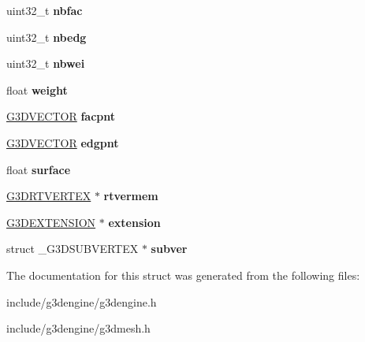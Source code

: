 \begin{DoxyCompactItemize}
\item 
\mbox{\label{struct__G3DVERTEX_a05bfa59c4f4d183ff1b148605353e336}} 
uint32\+\_\+t {\bfseries nbfac}
\item 
\mbox{\label{struct__G3DVERTEX_ad70b96f8b45c11d8a4779f0d58c625f6}} 
uint32\+\_\+t {\bfseries nbedg}
\item 
\mbox{\label{struct__G3DVERTEX_a1cbb7096622af76fb5b84c6425c23a5f}} 
uint32\+\_\+t {\bfseries nbwei}
\item 
\mbox{\label{struct__G3DVERTEX_a3c599f5c20b4c4006817278817d275e9}} 
float {\bfseries weight}
\item 
\mbox{\label{struct__G3DVERTEX_a9dcb3a95b512697296863ba392d60b39}} 
\hyperlink{structG3DVECTOR}{G3\+D\+V\+E\+C\+T\+OR} {\bfseries facpnt}
\item 
\mbox{\label{struct__G3DVERTEX_ab2670b69cc9220392b9759a4f5c8651e}} 
\hyperlink{structG3DVECTOR}{G3\+D\+V\+E\+C\+T\+OR} {\bfseries edgpnt}
\item 
\mbox{\label{struct__G3DVERTEX_a8d66921a7358047aa269addd56767a1b}} 
float {\bfseries surface}
\item 
\mbox{\label{struct__G3DVERTEX_a655e3d14e8b5e9dbfd8a9382b155a147}} 
\hyperlink{struct__G3DRTVERTEX}{G3\+D\+R\+T\+V\+E\+R\+T\+EX} $\ast$ {\bfseries rtvermem}
\item 
\mbox{\label{struct__G3DVERTEX_ad787300f8dd26420972d674b4f744eb7}} 
\hyperlink{struct__G3DEXTENSION}{G3\+D\+E\+X\+T\+E\+N\+S\+I\+ON} $\ast$ {\bfseries extension}
\item 
\mbox{\label{struct__G3DVERTEX_a2d38b8479ebceb505d983c452093c6cf}} 
struct \+\_\+\+G3\+D\+S\+U\+B\+V\+E\+R\+T\+EX $\ast$ {\bfseries subver}
\end{DoxyCompactItemize}


The documentation for this struct was generated from the following files\+:\begin{DoxyCompactItemize}
\item 
include/g3dengine/g3dengine.\+h\item 
include/g3dengine/g3dmesh.\+h\end{DoxyCompactItemize}
